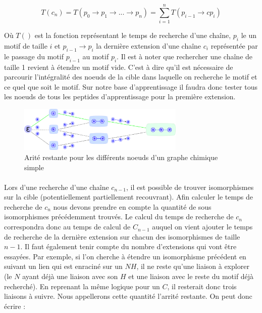 \documentclass[12pt,french,twoside]{report}
\begin{document}
\begin{equation}
 T(c_n) = T(p_0 \rightarrow p_1 \rightarrow ... \rightarrow p_n) = \sum_{i=1}^n T(p_{i-1} \rightarrow cp_i)
\end{equation}

Où $T()$ est la fonction représentant le temps de recherche d'une chaîne, $p_i$ le un motif de taille $i$ et $p_{i-1} \rightarrow
p_i$ la dernière extension d'une chaîne $c_i$ représentée par le passage du motif $p_{i-1}$ au motif $p_i$. Il est à noter que
rechercher une chaîne de taille 1 revient à étendre un motif vide. C'est à dire qu'il est nécessaire de parcourir l'intégralité
des noeuds de la cible dans laquelle on recherche le motif et ce quel que soit le motif. Sur notre base d'apprentissage il faudra
donc tester tous les noeuds de tous les peptides d'apprentissage pour la première extension.

\begin{figure}
  \includegraphics[width=300px]{Figures/s2m/indexation/glouton.png}
  \caption{\label{arrite}Arité restante pour les différents noeuds d'un graphe chimique simple}
\end{figure}

\paragraph{}Lors d'une recherche d'une chaîne $c_{n-1}$, il est possible de trouver isomorphismes sur la cible
(potentiellement partiellement recouvrant). Afin calculer le temps de recherche de $c_n$ nous devons prendre en compte
la quantité de sous isomorphismes précédemment trouvés. Le calcul du temps de recherche de $c_n$ correspondra donc au temps de
calcul de $C_{n-1}$ auquel on vient ajouter le temps de recherche de la dernière extension sur chacun des isomorphismes de taille
$n-1$. Il faut également tenir compte du nombre d'extensions qui vont être essayées. Par exemple, si l'on cherche à étendre un
isomorphisme précédent en suivant un lien qui est enraciné sur un $NH$, il ne reste qu'une liaison à explorer (le $N$ ayant déjà
une liaison avec son $H$ et une liaison avec le reste du motif déjà recherché). En reprenant la même logique pour un $C$, il
resterait donc trois liaisons à suivre. Nous appellerons cette quantité l'arrité restante. On peut donc écrire :
\end{document}
